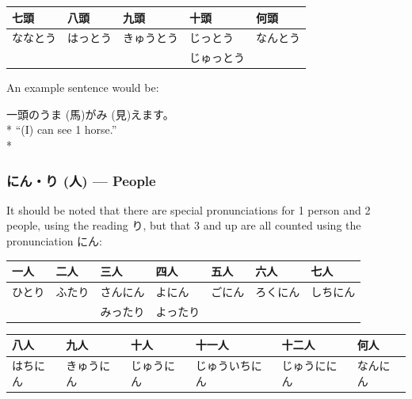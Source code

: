 \documentclass[11pt, b5paper, twoside, openright, onecolumn]{book}
\makeatletter
\newcommand*{\rubystack}[2]{{\relscale{0.5}%
  \begin{tabular}[b]{@{}c@{}}%
    {#1}\\%
   {\textscale{2}{#2}}%
  \end{tabular}}%
}
\DeclareRobustCommand*{\ruby}[2]{%
  \mbox{%
    \setlength{\parskip}{0ex}%
    \BeginAccSupp{method=pdfstringdef,ActualText={#1}}%
      \rubystack{\phantom{#2}}{#1}%
      \llap{%
        \rubystack{#2}{\phantom{#1}}%
      }%
    \EndAccSupp{}%
  }%
}
\renewcommand*{\ruby}[2]{#2 (#1)}%
\newenvironment{exampleblock}{
\setlength{\parindent}{0.6in}
\begin{minipage}[t]{\dimexpr\textwidth-\parindent}}
{\end{minipage}}
\newenvironment{mytabular}[1]{\noindent\hspace{0.4in}
\begin{tabular}[h]{#1}}{\end{tabular}}
\newenvironment{mytabularcentered}[1]{\noindent
\begin{center}\begin{tabular}[h]{#1}}{\end{tabular}\end{center}}
\makeatother
\begin{document}
\smaller
\begin{mytabular}{| l  l  l  l  l |}\hline 
\rule{0pt}{2.4ex}七頭 & 八頭 & 九頭 & 十頭 & 何頭\\ 
\hline
\rule{0pt}{2.4ex}ななとう & はっとう & きゅうとう & じっとう & なんとう\\ 
\rule{0pt}{2.4ex} &  &  & じゅっとう & \\ 
\hline 
\end{mytabular}
\larger
\vspace{0.5cm}


An example sentence would be:

\vspace{0.4cm}
\begin{exampleblock}
一頭の\ruby{馬}{うま}が\ruby{見}{み}えます。 \\* 
“(I) can see 1 horse.” \\* 
\end{exampleblock}
\subsubsection{\ruby{人}{にん・り} — People}


It should be noted that there are special pronunciations for 1 person and 2 people‚ using the reading り‚ but that 3 and up are all counted using the pronunciation にん:

\vspace{0.5cm}
\smaller
\begin{mytabular}{| l  l  l  l  l  l  l |}\hline 
\rule{0pt}{2.4ex}一人 & 二人 & 三人 & 四人 & 五人 & 六人 & 七人\\ 
\hline
\rule{0pt}{2.4ex}ひとり & ふたり & さんにん & よにん & ごにん & ろくにん & しちにん\\ 
\rule{0pt}{2.4ex} &  & みったり & よったり &  &  & \\ 
\hline 
\end{mytabular}
\larger
\vspace{0.5cm}

\smaller
\begin{center}
\begin{mytabularcentered}{| l  l  l  l  l  l |}\hline 
\rule{0pt}{2.4ex}八人 & 九人 & 十人 & 十一人 & 十二人 & 何人\\ 
\hline
\rule{0pt}{2.4ex}はちにん & きゅうにん & じゅうにん & じゅういちにん & じゅうににん & なんにん\\ 
\hline 
\end{mytabularcentered}
\end{center}
\larger
\vspace{0.5cm}
\end{document}
